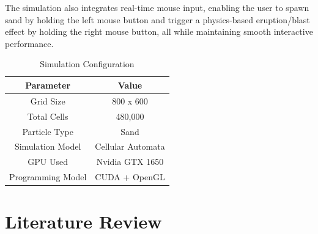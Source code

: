 \documentclass[12pt,a4paper]{article}
\begin{document}
    The simulation also integrates real-time mouse input, enabling the user to spawn sand by holding 
    the left mouse button and trigger a physics-based eruption/blast effect by holding the right mouse 
    button, all while maintaining smooth interactive performance.
    \begin{table}[h]
    \centering
    \begin{tabular}{|c|c|}
    \hline
    Parameter & Value \\
    \hline
    Grid Size & 800 x 600 \\
    Total Cells & 480,000 \\
    Particle Type & Sand \\
    Simulation Model & Cellular Automata \\
    GPU Used & Nvidia GTX 1650 \\
    Programming Model & CUDA + OpenGL \\
    \hline
    \end{tabular}
    \caption{Simulation Configuration}
    \end{table}


	\newpage
	\section{Literature Review}
\end{document}
